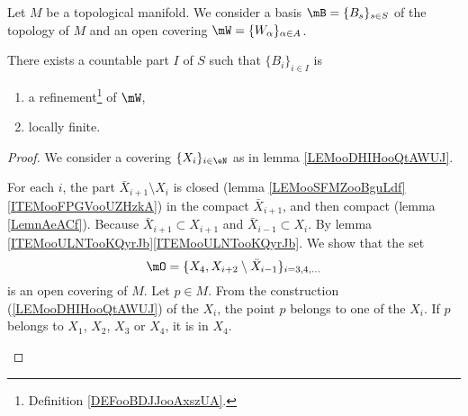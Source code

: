 \begin{proposition}			\label{PROPooKAXIooNhNkNB}
	Let \( M\) be a topological manifold. We consider a basis \( \mB=\{ B_s \}_{s\in S}\) of the topology of \( M\) and an open covering \( \mW=\{ W_{\alpha} \}_{\alpha\in A}\).

	There exists a countable part \( I\) of \( S\) such that \( \{ B_i \}_{i\in I}\) is
	\begin{enumerate}
		\item
		      a refinement\footnote{Definition \ref{DEFooBDJJooAxszUA}.} of \( \mW\),
		\item
		      locally finite.
	\end{enumerate}
\end{proposition}

\begin{proof}
	We consider a covering \( \{ X_i \}_{i\in \eN}\) as in lemma \ref{LEMooDHIHooQtAWUJ}.
	\begin{subproof}
		For each \( i\), the part \( \bar X_{i+1}\setminus X_i\) is closed (lemma \ref{LEMooSFMZooBguLdf}\ref{ITEMooFPGVooUZHzkA}) in the compact \( \bar X_{i+1}\), and then compact (lemma \ref{LemnAeACf}).
		Because \( \bar X_{i+1}\subset X_{i+1}\) and \( \bar X_{i-1}\subset X_i\).
		By lemma \ref{ITEMooULNTooKQyrJb}\ref{ITEMooULNTooKQyrJb}.
		We show that the set
		\begin{equation}
			\mO=\{ X_4,X_{i+2}\setminus \bar X_{i-1} \}_{i=3,4,\ldots}
		\end{equation}
		is an open covering of \( M\). Let \( p\in M\). From the construction (\ref{LEMooDHIHooQtAWUJ}) of the \( X_i\), the point \( p\) belongs to one of the \( X_i\). If \( p\) belongs to \( X_1\), \( X_2\), \( X_3\) or \( X_4\), it is in \( X_4\).


\end{subproof}
\end{proof}
